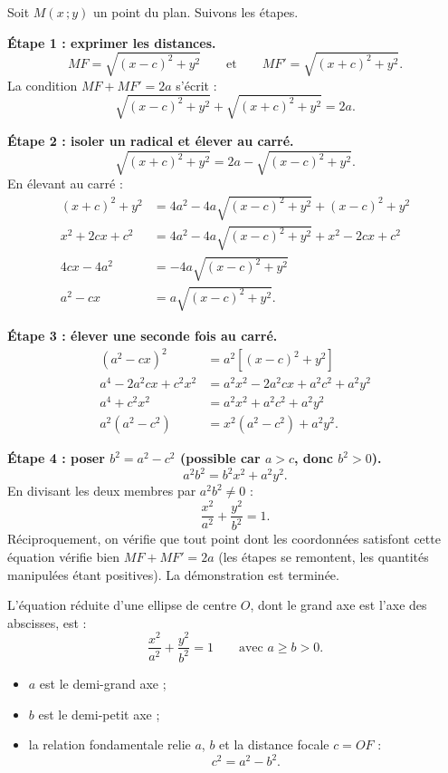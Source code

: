 \documentclass[11pt]{article}
\newcommand{\cle}[1]{{\popxbold\color{popdark}#1}}
\begin{document}
\begin{experience}[Démonstration guidée : de $MF + MF' = 2a$ à l'équation réduite]
Soit $M(x\,;y)$ un point du plan. Suivons les étapes.

\textbf{Étape 1 : exprimer les distances.}
\[ MF = \sqrt{(x-c)^2 + y^2} \qquad \text{et} \qquad MF' = \sqrt{(x+c)^2 + y^2}. \]
La condition $MF + MF' = 2a$ s'écrit :
\[ \sqrt{(x-c)^2 + y^2} + \sqrt{(x+c)^2 + y^2} = 2a. \]

\textbf{Étape 2 : isoler un radical et élever au carré.}
\[ \sqrt{(x+c)^2 + y^2} = 2a - \sqrt{(x-c)^2 + y^2}. \]
En élevant au carré :
\begin{align*}
(x+c)^2 + y^2 &= 4a^2 - 4a\sqrt{(x-c)^2 + y^2} + (x-c)^2 + y^2 \\
x^2 + 2cx + c^2 &= 4a^2 - 4a\sqrt{(x-c)^2 + y^2} + x^2 - 2cx + c^2 \\
4cx - 4a^2 &= -4a\sqrt{(x-c)^2 + y^2} \\
a^2 - cx &= a\sqrt{(x-c)^2 + y^2}.
\end{align*}

\textbf{Étape 3 : élever une seconde fois au carré.}
\begin{align*}
(a^2 - cx)^2 &= a^2\left[(x-c)^2 + y^2\right] \\
a^4 - 2a^2cx + c^2x^2 &= a^2x^2 - 2a^2cx + a^2c^2 + a^2y^2 \\
a^4 + c^2x^2 &= a^2x^2 + a^2c^2 + a^2y^2 \\
a^2(a^2 - c^2) &= x^2(a^2 - c^2) + a^2y^2.
\end{align*}

\textbf{Étape 4 : poser $b^2 = a^2 - c^2$ (possible car $a > c$, donc $b^2 > 0$).}
\[ a^2 b^2 = b^2 x^2 + a^2 y^2. \]
En divisant les deux membres par $a^2b^2 \neq 0$ :
\[ \frac{x^2}{a^2} + \frac{y^2}{b^2} = 1. \]
Réciproquement, on vérifie que tout point dont les coordonnées satisfont cette équation vérifie bien $MF + MF' = 2a$ (les étapes se remontent, les quantités manipulées étant positives). La démonstration est terminée.
\end{experience}

\begin{definition}
L'\cle{équation réduite} d'une ellipse de centre $O$, dont le grand axe est l'axe des abscisses, est :
\[ \frac{x^2}{a^2} + \frac{y^2}{b^2} = 1 \qquad \text{avec } a \geq b > 0. \]
\begin{itemize}
\item $a$ est le \cle{demi-grand axe} ;
\item $b$ est le \cle{demi-petit axe} ;
\item la \cle{relation fondamentale} relie $a$, $b$ et la distance focale $c = OF$ :
\[ c^2 = a^2 - b^2. \]
\end{itemize}
\end{definition}
\end{document}
